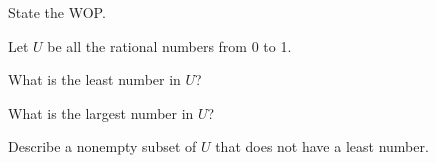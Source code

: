 \documentclass[handout]{mcs}
\begin{document}

\begin{problem}

State the WOP.
\end{problem}

\begin{problem}
 Let $U$ be all the rational numbers from 0 to 1.

\begin{problemparts}

\ppart What is the least number in $U$?

\ppart What is the largest number in $U$?

\ppart Describe a nonempty subset of $U$ that does not have a least number.

\end{problemparts}

\end{problem}

\end{document}
